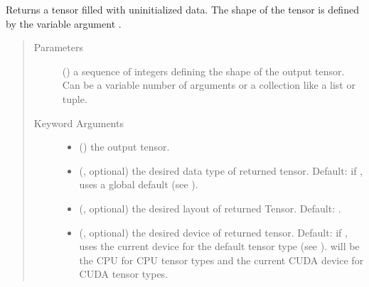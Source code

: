 \documentclass[letterpaper,10pt,english]{sphinxmanual}
\begin{document}
\begin{fulllineitems}
\label{\detokenize{nn:nn.linear.empty}}
Returns a tensor filled with uninitialized data. The shape of the tensor is
defined by the variable argument .
\begin{quote}\begin{description}
\item[{Parameters}] \leavevmode
{} () \textendash{} a sequence of integers defining the shape of the output tensor.
Can be a variable number of arguments or a collection like a list or tuple.

\item[{Keyword Arguments}] \leavevmode\begin{itemize}
\item {} 
 (\sphinxstyleliteralemphasis{\sphinxupquote{, }}) \textendash{} the output tensor.

\item {} 
 (, optional) \textendash{} the desired data type of returned tensor.
Default: if , uses a global default (see ).

\item {} 
 (, optional) \textendash{} the desired layout of returned Tensor.
Default: .

\item {} 
 (, optional) \textendash{} the desired device of returned tensor.
Default: if , uses the current device for the default tensor type
(see ).  will be the CPU
for CPU tensor types and the current CUDA device for CUDA tensor types.


\end{itemize}
\end{description}
\end{quote}
\end{fulllineitems}
\end{document}

